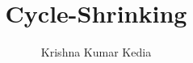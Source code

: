 \documentclass[a4paper,12pt]{article}
\title{Cycle-Shrinking}
\author{Krishna Kumar Kedia}
\begin{document}
\begin{titlepage}
\maketitle
\end{titlepage}
\end{document}
